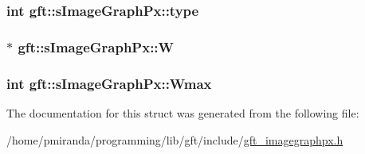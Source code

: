 \subsubsection[{\texorpdfstring{type}{type}}]{\setlength{\rightskip}{0pt plus 5cm}int gft\+::s\+Image\+Graph\+Px\+::type}\hypertarget{structgft_1_1sImageGraphPx_a8658742a1d494c94f0971c9821bf2738}{}\label{structgft_1_1sImageGraphPx_a8658742a1d494c94f0971c9821bf2738}
\subsubsection[{\texorpdfstring{W}{W}}]{$\ast$ gft\+::s\+Image\+Graph\+Px\+::W}\hypertarget{structgft_1_1sImageGraphPx_a564f80400a073c030dd4f200582c1752}{}\label{structgft_1_1sImageGraphPx_a564f80400a073c030dd4f200582c1752}
\subsubsection[{\texorpdfstring{Wmax}{Wmax}}]{\setlength{\rightskip}{0pt plus 5cm}int gft\+::s\+Image\+Graph\+Px\+::\+Wmax}\hypertarget{structgft_1_1sImageGraphPx_a4f3aba97b6dfc649f8bb4294b38a9a98}{}\label{structgft_1_1sImageGraphPx_a4f3aba97b6dfc649f8bb4294b38a9a98}


The documentation for this struct was generated from the following file\+:\begin{DoxyCompactItemize}
\item 
/home/pmiranda/programming/lib/gft/include/\hyperlink{gft__imagegraphpx_8h}{gft\+\_\+imagegraphpx.\+h}\end{DoxyCompactItemize}
